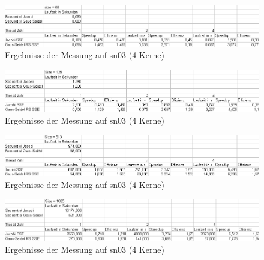 \documentclass{article}
\begin{document}
\begin{figure}[h] 
  \centering
     \includegraphics[width=1.0\textwidth]{bilder/sn365.png}
  \caption{Ergebnisse der Messung auf sn03 (4 Kerne)}
\end{figure}
\begin{figure}[h] 
  \centering
     \includegraphics[width=1.0\textwidth]{bilder/sn3129.png}
  \caption{Ergebnisse der Messung auf sn03 (4 Kerne)}
\end{figure}
\begin{figure}[h] 
  \centering
     \includegraphics[width=1.0\textwidth]{bilder/sn3513.png}
  \caption{Ergebnisse der Messung auf sn03 (4 Kerne)}
\end{figure}
\begin{figure}[h] 
  \centering
     \includegraphics[width=1.0\textwidth]{bilder/sn31025.png}
  \caption{Ergebnisse der Messung auf sn03 (4 Kerne)}
\end{figure}
\end{document}
